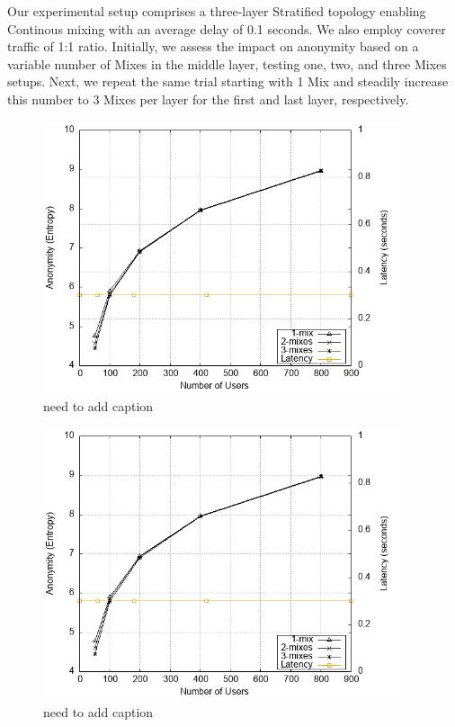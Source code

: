 \documentclass[logo,msc,cyber]{infthesis}   %
\begin{document}
Our experimental setup comprises a three-layer Stratified topology enabling
Continous mixing with an average delay of 0.1 seconds. We also employ coverer
traffic of 1:1 ratio. Initially, we assess the impact on anonymity based on a
variable number of Mixes in the middle layer, testing one, two, and three
Mixes setups. Next, we repeat the same trial starting with 1 Mix and steadily
increase this number to 3 Mixes per layer for the first and last layer,
respectively.

\begin{figure}[h!]
    \centering
    \includegraphics[height=8cm]{figures/simulator_extentions/first_layer_variable.png}
    \caption{need to add caption}
    \label{fig:first-layer-variable}
\end{figure} 

\begin{figure}[h!]
    \centering
    \includegraphics[height=8cm]{figures/simulator_extentions/last_layer_variable.png}
    \caption{need to add caption}
    \label{fig:last-layer-variable}
\end{figure} 
\end{document}
